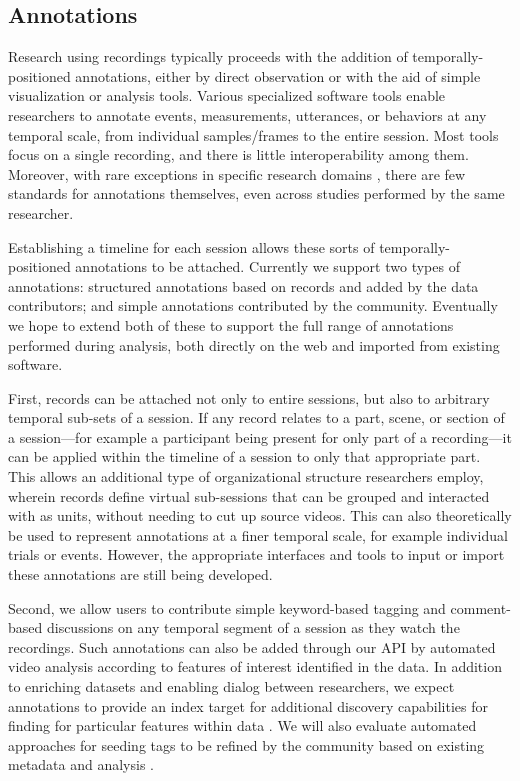 \documentclass{sig-alternate}
\begin{document}
\subsection{Annotations}

Research using recordings typically proceeds with the addition of temporally-positioned annotations, either by direct observation or with the aid of simple visualization or analysis tools.
Various specialized software tools enable researchers to annotate events, measurements, utterances, or behaviors at any temporal scale, from individual samples/frames to the entire session.
Most tools focus on a single recording, and there is little interoperability among them.
Moreover, with rare exceptions in specific research domains \cite{MacWhinney2001}, there are few standards for annotations themselves, even across studies performed by the same researcher. 

Establishing a timeline for each session allows these sorts of temporally-positioned annotations to be attached.
Currently we support two types of annotations: structured annotations based on records and added by the data contributors; and simple annotations contributed by the community.
Eventually we hope to extend both of these to support the full range of annotations performed during analysis, both directly on the web and imported from existing software.

First, records can be attached not only to entire sessions, but also to arbitrary temporal sub-sets of a session.
If any record relates to a part, scene, or section of a session---for example a participant being present for only part of a recording---it can be applied within the timeline of a session to only that appropriate part.
This allows an additional type of organizational structure researchers employ, wherein records define virtual sub-sessions that can be grouped and interacted with as units, without needing to cut up source videos.
This can also theoretically be used to represent annotations at a finer temporal scale, for example individual trials or events.
However, the appropriate interfaces and tools to input or import these annotations are still being developed.

Second, we allow users to contribute simple keyword-based tagging and comment-based discussions on any temporal segment of a session as they watch the recordings.
Such annotations can also be added through our API by automated video analysis according to features of interest identified in the data.
In addition to enriching datasets and enabling dialog between researchers, we expect annotations to provide an index target for additional discovery capabilities for finding for particular features within data \cite{Lanagan_Smeaton_2012}.
We will also evaluate automated approaches for seeding tags to be refined by the community based on existing metadata and analysis \cite{Yang_Lu_Giles_2011,Farooq_etal_2007,Giles2013}.
\end{document}
